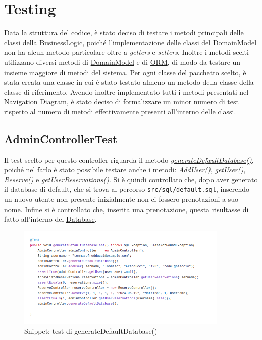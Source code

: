\documentclass{article}
\begin{document}
{\section{Testing}\label{sec:testing}
    Data la struttura del codice, è stato deciso di testare i metodi principali delle classi della \hyperref[subsec:BusinessLogic]{BusinessLogic}, poiché l'implementazione delle classi del \hyperref[subsec:domainmodel]{DomainModel} non ha alcun metodo particolare oltre a \textit{getters} e \textit{setters}. Inoltre i metodi scelti utilizzano diversi metodi di \hyperref[subsec:domainmodel]{DomainModel} e di \hyperref[subsec:ORM]{ORM}, di modo da testare un insieme maggiore di metodi del sistema. Per ogni classe del pacchetto scelto, è stata creata una classe in cui è stato testato almeno un metodo della classe della classe di riferimento. Avendo inoltre implementato tutti i metodi presentati nel \hyperref[subsec:navigation-diagram]{Navigation Diagram}, è stato deciso di formalizzare un minor numero di test rispetto al numero di metodi effettivamente presenti all'interno delle classi.
\subsection{AdminControllerTest}\label{subsec:admincontrollertest}
 Il test scelto per questo controller riguarda il metodo \hyperref[fig:snippetadmindao]{\textit{generateDefaultDatabase()}}, poiché nel farlo è stato possibile testare anche i metodi: \textit{AddUser()}, \textit{getUser()}, \textit{Reserve()} e \textit{getUserReservations()}. Si è quindi controllato che, dopo aver generato il database di default, che si trova al percorso \texttt{src/sql/default.sql}, inserendo un nuovo utente non presente inizialmente non ci fossero prenotazioni a suo nome. Infine si è controllato che, inserita una prenotazione, questa risultasse di fatto all'interno del \hyperref[subsec:Database]{Database}.
\begin{figure}[H]
                \centering
                \includegraphics[width=0.9\textwidth]{Images/Snippets/TestAdminController.png}
                \captionsetup{labelformat=empty,labelsep=none}
                \caption{Snippet: test di generateDefaultDatabase()}
                \label{fig:Admincontrollertestsnippets}
            \end{figure}

}
\end{document}
